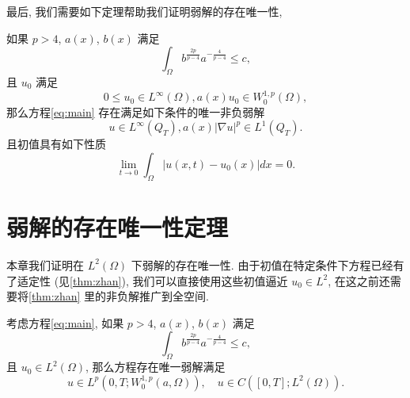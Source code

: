 \documentclass[oneside,longtitle]{LZUthesis}
\numberwithin{equation}{chapter}
\newcommand*\abs[1]{\lvert#1\rvert}
\begin{document}
最后, 我们需要如下定理帮助我们证明弱解的存在唯一性,
\begin{theorem}\cite[定理 1.3 和 1.6]{Zhan2019Uniquenessa}\label{thm:zhan}
	如果 $p>4$, $a(x)$, $b(x)$ 满足
	\begin{equation}\label{eq:zhan_intcondition}
		\int_{\Omega} b^{\frac{2p}{p-4}}a^{-\frac{4}{p-4}} \leq c,
	\end{equation}
	且 $u_0$ 满足
	\begin{equation}\label{eq:zhan_initdata}
		0 \leq u_0 \in L^{\infty}(\Omega), a(x)u_0 \in W_0^{1,p}(\Omega),
	\end{equation}
	那么方程\eqref{eq:main} 存在满足如下条件的唯一非负弱解
	\begin{equation*}
		u \in L^{\infty}(Q_T), a(x)\abs{\nabla u}^p \in L^1(Q_T).
	\end{equation*}
	且初值具有如下性质
	\begin{equation*}
		\lim_{t \to 0}\int_{\Omega}\abs{u(x,t) - u_0(x)}dx = 0.
	\end{equation*}
\end{theorem}

\section{弱解的存在唯一性定理}
本章我们证明在 $L^2(\Omega)$ 下弱解的存在唯一性.
由于初值在特定条件下方程已经有了适定性 (见\cref{thm:zhan}),
我们可以直接使用这些初值逼近 $u_0 \in L^2$, 在这之前还需要将\cref{thm:zhan} 里的非负解推广到全空间.
\begin{theorem}\label{thm:absorb}
	考虑方程\eqref{eq:main}, 如果 $p>4$, $a(x)$, $b(x)$ 满足
	\begin{equation*}
		\int_{\Omega} b^{\frac{2p}{p-4}}a^{-\frac{4}{p-4}} \leq c,
	\end{equation*}
	且 $u_0 \in L^2(\Omega) $, 那么方程存在唯一弱解满足
	\begin{equation*}
		u \in L^p(0, T; W_0^{1,p}(a,\Omega)), \quad u \in C([0, T]; L^2(\Omega)).
	\end{equation*}
\end{theorem}
\end{document}
